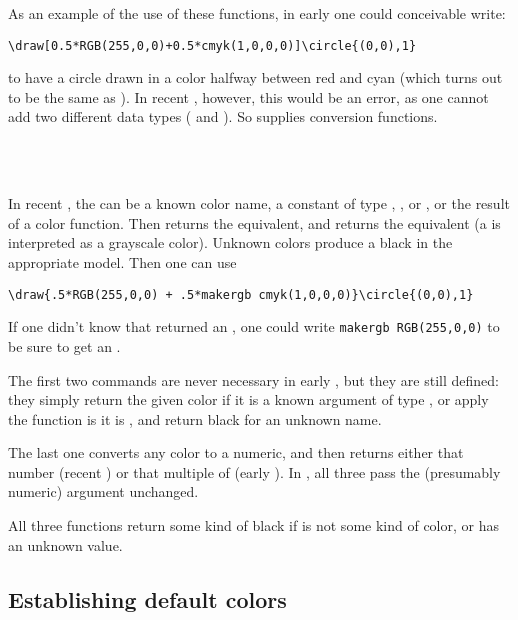 \documentclass[letterpaper]{article}
\begin{document}
\medskip
As an example of the use of these functions, in early \MP{} one could
conceivable write:
%
\begin{verbatim}
\draw[0.5*RGB(255,0,0)+0.5*cmyk(1,0,0,0)]\circle{(0,0),1}
\end{verbatim}
%
to have a circle drawn in a color halfway between red and cyan (which
turns out to be the same as ). In recent \MP{}, however,
this would be an error, as one cannot add two different data types
( and ). So \mfp{} supplies conversion functions.

\begin{cd}
\\
\\
%
%
%
\end{cd}

In recent \MP{}, the  can be a known color name, a constant
of type , , or , or the result of
a color function. Then  returns the 
equivalent, and  returns the  equivalent (a
  is interpreted as a grayscale color). Unknown
colors produce a black in the appropriate model. Then one can use
%
\begin{verbatim}
\draw{.5*RGB(255,0,0) + .5*makergb cmyk(1,0,0,0)}\circle{(0,0),1}
\end{verbatim}
%
If one didn't know that  returned an , one
could write \verb$makergb RGB(255,0,0)$ to be sure to get an
.

The first two commands are never necessary in early \MP{}, but they are
still defined: they simply return the given color if it is a known
argument of type , or apply the function  is it is
, and return black for an unknown name.

The last one  converts any color to a numeric, and then
returns either that number (recent \MP) or that multiple of 
(early \MP). In \MF{}, all three pass the (presumably numeric) argument
 unchanged.

All three functions return some kind of black if  is not some
kind of color, or has an unknown value.


\subsection{Establishing \mfp{} default colors}\label{defaultcolors}
\end{document}
